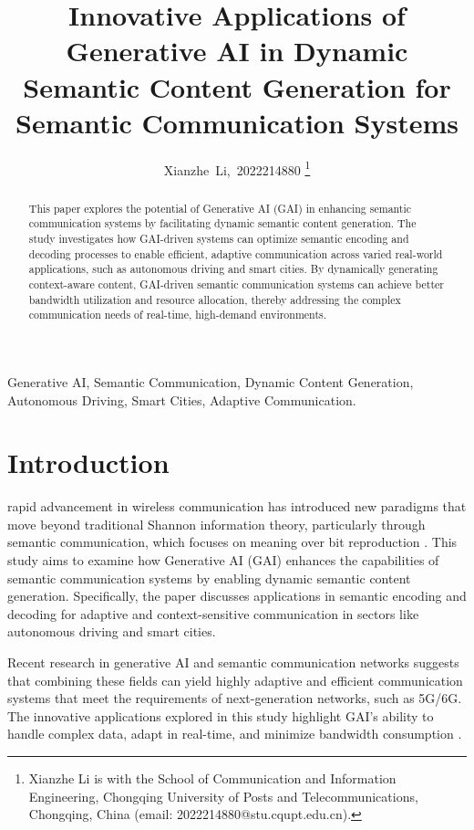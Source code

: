 \documentclass[journal]{IEEEtran}
\title{Innovative Applications of Generative AI in Dynamic Semantic Content Generation for Semantic Communication Systems}
\author{Xianzhe~Li,~2022214880%
\thanks{Xianzhe Li is with the School of Communication and Information Engineering, Chongqing University of Posts and Telecommunications, Chongqing, China (email: 2022214880@stu.cqupt.edu.cn).}
}
\begin{document}
\maketitle

\begin{abstract}
This paper explores the potential of Generative AI (GAI) in enhancing semantic communication systems by facilitating dynamic semantic content generation. The study investigates how GAI-driven systems can optimize semantic encoding and decoding processes to enable efficient, adaptive communication across varied real-world applications, such as autonomous driving and smart cities. By dynamically generating context-aware content, GAI-driven semantic communication systems can achieve better bandwidth utilization and resource allocation, thereby addressing the complex communication needs of real-time, high-demand environments.
\end{abstract}

\begin{IEEEkeywords}
Generative AI, Semantic Communication, Dynamic Content Generation, Autonomous Driving, Smart Cities, Adaptive Communication.
\end{IEEEkeywords}

\IEEEpeerreviewmaketitle

\section{Introduction}
 rapid advancement in wireless communication has introduced new paradigms that move beyond traditional Shannon information theory, particularly through semantic communication, which focuses on meaning over bit reproduction \cite{9530497}. This study aims to examine how Generative AI (GAI) enhances the capabilities of semantic communication systems by enabling dynamic semantic content generation. Specifically, the paper discusses applications in semantic encoding and decoding for adaptive and context-sensitive communication in sectors like autonomous driving and smart cities.

Recent research in generative AI \cite{Radford2018ImprovingLU} and semantic communication networks \cite{10614204,10447237} suggests that combining these fields can yield highly adaptive and efficient communication systems that meet the requirements of next-generation networks, such as 5G/6G. The innovative applications explored in this study highlight GAI’s ability to handle complex data, adapt in real-time, and minimize bandwidth consumption \cite{liu2024semanticcommunicationsartificialintelligence}.
\end{document}
